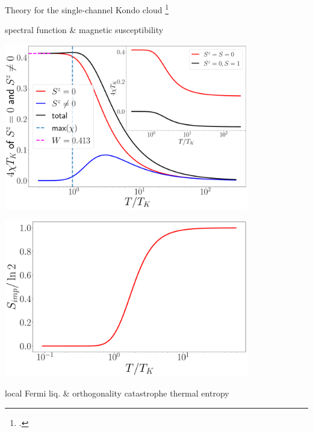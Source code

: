 \documentclass[9pt,aspectratio=169]{beamer}
\begin{document}
\begin{frame}{Theory for the single-channel Kondo cloud}
\footcite{kondo1964resistance,wilson1975,andreiKondoreview,hewson1993,nozieres1974fermi,anderson1970,tsvelickKondoreview,affleck1993exact,Goldhaber-Gordon1998,Borzenets2020,sakai_osamu_shimizu,costi_hewson_1990,nozaki2012,affleck1995conformal}

\begin{minipage}{0.49\textwidth}
\centering
\begin{itemize}
\nitem spectral function \& magnetic susceptibility
\end{itemize}

\vspace*{10pt}

\includegraphics[width=0.8\textwidth]{chi_parts.pdf}
\end{minipage}
\begin{minipage}{0.49\textwidth}
\centering
\includegraphics[width=0.8\textwidth]{entropy_therm.pdf}

\vspace*{10pt}

\begin{itemize}
\nitem local Fermi liq. \& orthogonality catastrophe
\nitem thermal entropy
\end{itemize}
\end{minipage}

\end{frame}
\end{document}
